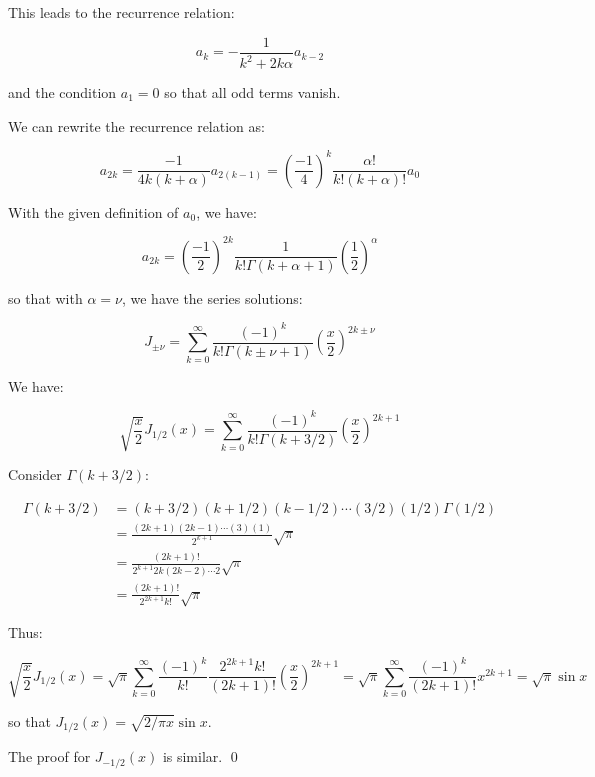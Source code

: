 \documentclass[12pt]{article}
\begin{document}
This leads to the recurrence relation:

\begin{equation}
    a_{k} = -\frac{1}{k^{2} + 2k\alpha} a_{k-2}
\end{equation}

and the condition $a_{1} = 0$ so that all odd terms vanish.


We can rewrite the recurrence relation as:

\begin{equation}
    a_{2k} = \frac{-1}{4k(k + \alpha)} a_{2(k-1)} = \left( \frac{-1}{4} \right)^{k} \frac{\alpha!}{k! (k + \alpha)!} a_{0}
\end{equation}

With the given definition of $a_{0}$, we have:

\begin{equation}
    a_{2k} = \left( \frac{-1}{2} \right)^{2k} \frac{1}{k!\Gamma(k + \alpha + 1)} \left( \frac{1}{2} \right)^{\alpha}
\end{equation}

so that with $\alpha = \nu$, we have the series solutions:

\begin{equation}
    J_{\pm \nu} = \sum_{k=0}^{\infty} \frac{(-1)^{k}}{k! \Gamma(k \pm \nu + 1)} \left( \frac{x}{2} \right)^{2k \pm \nu}
\end{equation}

We have:

\begin{equation}
    \sqrt{\frac{x}{2}} J_{1/2}(x) = \sum_{k=0}^{\infty} \frac{(-1)^{k}}{k! \Gamma(k + 3/2)} \left( \frac{x}{2} \right)^{2k + 1}
\end{equation}

Consider $\Gamma(k + 3/2)$:

\begin{equation}
\begin{split}
    \Gamma(k + 3/2) &= (k + 3/2) (k + 1/2) (k - 1/2) \cdots (3/2) (1/2) \Gamma(1/2) \\
    &= \frac{(2k + 1)(2k - 1) \cdots (3)(1)}{2^{k+1}} \sqrt{\pi} \\
    &= \frac{(2k + 1)!}{2^{k + 1} 2k (2k-2) \cdots 2} \sqrt{\pi} \\
    &= \frac{(2k + 1)!}{2^{2k + 1} k!} \sqrt{\pi}
\end{split}
\end{equation}

Thus:

\begin{equation}
    \sqrt{\frac{x}{2}} J_{1/2}(x) = \sqrt{\pi} \sum_{k=0}^{\infty} \frac{(-1)^{k}}{k!} \frac{2^{2k + 1} k!}{(2k + 1)!} \left( \frac{x}{2} \right)^{2k + 1} = \sqrt{\pi} \sum_{k=0}^{\infty} \frac{(-1)^{k}}{(2k + 1)!} x^{2k + 1} = \sqrt{\pi} \sin{x}
\end{equation}

so that $J_{1/2}(x) = \sqrt{2/\pi x} \sin{x}$.

The proof for $J_{-1/2}(x)$ is similar.
\qed
\end{document}
